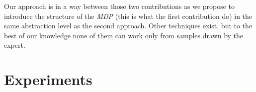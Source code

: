 \documentclass{article}
\begin{document}

Our approach is in a way between those two contributions as we propose to introduce the structure of the \emph{MDP} (this is what the first contribution do) in the same abstraction level as the second approach. Other techniques exist, but to the best of our knowledge none of them can work only from samples drawn by the expert.

\section{Experiments}
\label{exp.sec}
\end{document}
